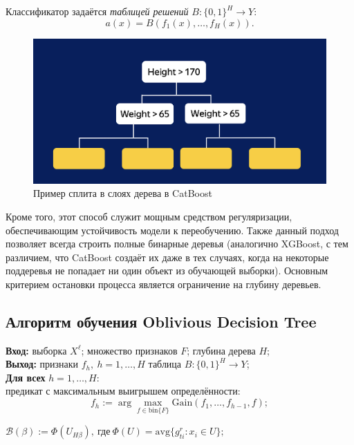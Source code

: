 Классификатор задаётся \textit{таблицей решений} $B: \{0,1\}^H \to Y$:
$$
a(x) = B(f_1(x), \ldots, f_H(x)).
$$

\begin{figure}[ht]
    \centering
    \includegraphics[width=15cm]{chapters/boosting/images/Tree.png}
    \caption{Пример сплита в слоях дерева в CatBoost}
\end{figure}

Кроме того, этот способ служит мощным средством регуляризации, обеспечивающим устойчивость модели к переобучению. Также данный подход позволяет всегда строить полные бинарные деревья (аналогично XGBoost, с тем различием, что CatBoost создаёт их даже в тех случаях, когда на некоторые поддеревья не попадает ни один объект из обучающей выборки). Основным критерием остановки процесса является ограничение на глубину деревьев.

\subsection*{Алгоритм обучения Oblivious Decision Tree}

\begin{tcolorbox}[colback=Lavender!10, colframe=Lavender]
\textbf{Вход:} выборка $X^\ell$; множество признаков $F$; глубина дерева $H$;\\
\textbf{Выход:} признаки $f_h, \ h = 1, \ldots, H$  таблица $B: \{0,1\}^H \to Y$;\\
\textbf{Для всех} $h = 1, \ldots, H$:\\
предикат с максимальным выигрышем определённости:
$$
f_h := \arg\max_{f \in \mathrm{bin}\{F\}} \text{Gain}(f_1, \ldots, f_{h-1}, f);
$$

\(\mathcal{B}(\beta) := \Phi(U_{H\beta}), \ \text{где} \ \Phi(U) = \text{avg}\{g_{ti}^r : x_i \in U\};\)
\end{tcolorbox}

